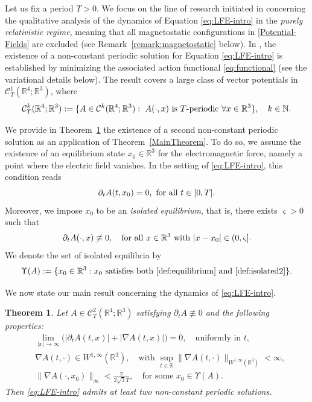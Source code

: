 \documentclass{article}
\newcommand{\boC}{\mathcal{C}}
\newcommand{\R}{\mathbb{R}}
\newtheorem{theorem}{Theorem}[section]
\theoremstyle{definition}
\begin{document}
	Let us fix a period $T>0$. We focus on the line of research initiated in \cite{GLM} concerning the qualitative analysis of the dynamics of Equation \eqref{eq:LFE-intro} in the \textsl{purely relativistic regime}, meaning that all magnetostatic configurations in \eqref{Potential-Fields} are excluded (see Remark~\ref{remark:magnetostatic} below). In \cite[Theorem 2.1]{GLM}, the existence of a non-constant periodic solution for Equation \eqref{eq:LFE-intro} is established by minimizing the associated action functional \eqref{eq:functional} (see the variational details below). The result covers a large class of vector potentials in $\mathcal{C}^1_T(\R^4;\R^3)$, where
	\begin{equation}
		\mathcal{C}^k_T(\R^4;\R^3):=\{A\in\mathcal{C}^k(\R^4;\R^3):\ A(\cdot,x) \hbox{ is $T$-periodic }\forall x\in\R^3\},\quad k\in\mathbb{N}.
	\end{equation} 
	
	We provide in Theorem~\ref{MainTheorem:LFE} the existence of a second non-constant periodic solution as an application of Theorem~\ref{MainTheorem}. To do so, we assume the existence of an equilibrium state $x_0 \in \R^3$ for the electromagnetic force, namely a point where the electric field vanishes. In the setting of \eqref{eq:LFE-intro}, this condition reads
	\begin{equation}\label{def:equilibrium}
		\partial_tA(t,x_0)=0,\hbox{ for all }t\in[0,T].
	\end{equation}
	Moreover, we impose $x_0$ to be an \textsl{isolated equilibrium}, that is, there exists $\varsigma>0$ such that
	\begin{equation}\label{def:isolated2}
		\partial_t A(\cdot,x)\not\equiv 0,\quad\text{for all }x\in\R^3\ \hbox{with }|x-x_0|\in(0,\varsigma].
	\end{equation}
	We denote  the set of isolated equilibria by
	\begin{equation}\label{def:EquilibriaSet}
		\Upsilon(A) := \{x_0 \in \R^3 : x_0 \text{ satisfies both \eqref{def:equilibrium} and \eqref{def:isolated2}}\}.
	\end{equation}
	
	
	We now state our main result concerning the dynamics of \eqref{eq:LFE-intro}.
	\begin{theorem}\label{MainTheorem:LFE}
		Let $A\in\boC_T^2(\R^4;\R^3)$ satisfying  $\partial_tA\not\equiv0$ and the following properties:
		\begin{align}
        \label{cond:A-decay}
			&\lim_{|x|\to\infty} \big(|\partial_t A(t,x)| + |\nabla A(t,x)|\big)=0,\quad\text{uniformly in }t,
            \\
            \label{hyp:bound-secondderivatives}
            &\nabla A(t,\cdot)\in W^{1,\infty}(\R^3),\quad\text{with }\sup_{t\in\R}\|\nabla A(t,\cdot)\|_{W^{1,\infty}(\R^3)}<\infty,
            \\
            \label{def:classA0}
            &\|\nabla A(\cdot,x_0)\|_{\infty}<\frac{\pi}{2\sqrt{3}T},\quad\text{for some }x_0\in\Upsilon(A).
		\end{align}
		Then \eqref{eq:LFE-intro} admits at least two non-constant periodic solutions.
	\end{theorem}
	
\end{document}
